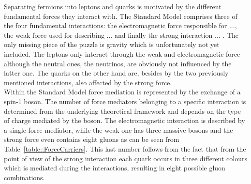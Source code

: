 Separating fermions into leptons and quarks is motivated by the different fundamental forces they interact with.
The Standard Model comprises three of the four fundamental interactions: the electromagnetic force responsible for ..., the weak force used for describing ... and finally the strong interaction ... .
The only missing piece of the puzzle is gravity which is unfortunately not yet included.
The leptons only interact through the weak and electromagnetic force although the neutral ones, the neutrinos, are obviously not influenced by the latter one. The quarks on the other hand are, besides by the two previously mentioned interactions, also affected by the strong force.
\\
Within the Standard Model force mediation is represented by the exchange of a spin-1 boson. 
The number of force mediators belonging to a specific interaction is determined from the underlying theoretical framework and depends on the type of charge mediated by the boson. The electromagnetic interaction is described by a single force mediator, while the weak one has three massive bosons and the strong force even contains eight gluons as can be seen from Table~\ref{table::ForceCarriers}.
This last number follows from the fact that from the point of view of the strong interaction each quark occurs in three different colours which is mediated during the interactions, resulting in eight possible gluon combinations.
\\
